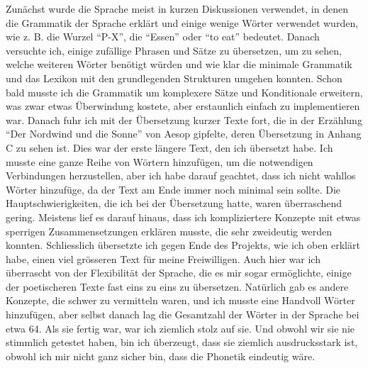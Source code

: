 \documentclass{article}
\begin{document}
Zunächst wurde die Sprache meist in kurzen Diskussionen verwendet,
in denen die Grammatik der Sprache erklärt und einige wenige Wörter verwendet wurden,
wie z. B. die Wurzel ``P-X'', die ``Essen'' oder ``to eat'' bedeutet. Danach versuchte ich,
einige zufällige Phrasen und Sätze zu übersetzen, um zu sehen, welche weiteren Wörter benötigt würden
und wie klar die minimale Grammatik und das Lexikon mit den grundlegenden Strukturen umgehen konnten.
Schon bald musste ich die Grammatik um komplexere Sätze und Konditionale erweitern,
was zwar etwas Überwindung kostete, aber erstaunlich einfach zu implementieren war.
Danach fuhr ich mit der Übersetzung kurzer Texte fort, die in der Erzählung ``Der Nordwind und die Sonne''
von Aesop gipfelte, deren Übersetzung in Anhang C zu sehen ist. Dies war der erste längere Text,
den ich übersetzt habe. Ich musste eine ganze Reihe von Wörtern hinzufügen,
um die notwendigen Verbindungen herzustellen, aber ich habe darauf geachtet,
dass ich nicht wahllos Wörter hinzufüge, da der Text am Ende immer noch minimal sein sollte.
Die Hauptschwierigkeiten, die ich bei der Übersetzung hatte, waren überraschend gering.
Meistens lief es darauf hinaus, dass ich kompliziertere Konzepte mit etwas sperrigen Zusammensetzungen
erklären musste, die sehr zweideutig werden konnten. Schliesslich übersetzte ich gegen Ende des Projekts,
wie ich oben erklärt habe, einen viel grösseren Text für meine Freiwilligen. Auch hier war ich überrascht
von der Flexibilität der Sprache, die es mir sogar ermöglichte, einige der poetischeren Texte fast eins
zu eins zu übersetzen. Natürlich gab es andere Konzepte, die schwer zu vermitteln waren, und ich musste
eine Handvoll Wörter hinzufügen, aber selbst danach lag die Gesamtzahl der Wörter in der Sprache bei etwa 64.
Als sie fertig war, war ich ziemlich stolz auf sie. Und obwohl wir sie nie stimmlich getestet haben,
bin ich überzeugt, dass sie ziemlich ausdrucksstark ist, obwohl ich mir nicht ganz sicher bin,
dass die Phonetik eindeutig wäre.
\end{document}
